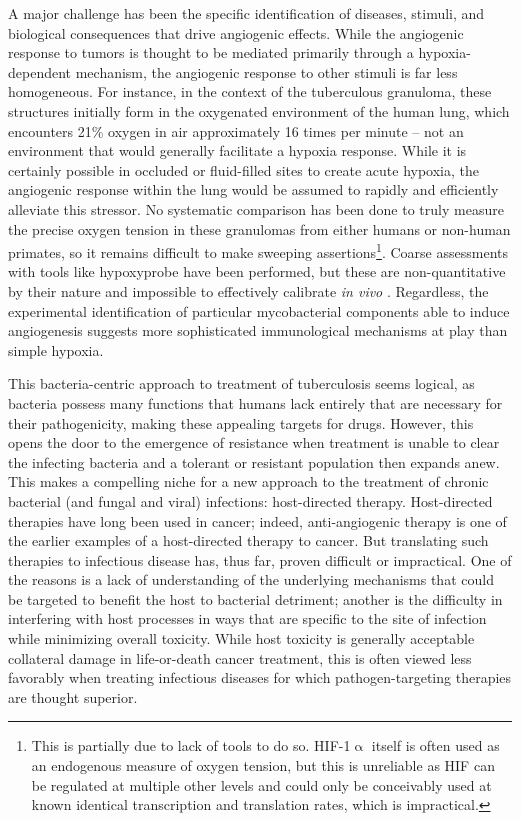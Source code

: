 A major challenge has been the specific identification of diseases, stimuli, and biological consequences that drive angiogenic effects. While the angiogenic response to tumors is thought to be mediated primarily through a hypoxia\hyp{}dependent mechanism, the angiogenic response to other stimuli is far less homogeneous. For instance, in the context of the tuberculous granuloma, these structures initially form in the oxygenated environment of the human lung, which encounters 21\% oxygen in air approximately 16 times per minute -- not an environment that would generally facilitate a hypoxia response. While it is certainly possible in occluded or fluid\hyp{}filled sites to create acute hypoxia, the angiogenic response within the lung would be assumed to rapidly and efficiently alleviate this stressor. No systematic comparison has been done to truly measure the precise oxygen tension in these granulomas from either humans or non\hyp{}human primates, so it remains difficult to make sweeping assertions\footnote{This is partially due to lack of tools to do so. HIF\hyp{}1$\upalpha$ itself is often used as an endogenous measure of oxygen tension, but this is unreliable as HIF can be regulated at multiple other levels and could only be conceivably used at known identical transcription and translation rates, which is impractical.}. Coarse assessments with tools like hypoxyprobe have been performed, but these are non\hyp{}quantitative by their nature and impossible to effectively calibrate \textit{in vivo} \citep{Cousins2016}. Regardless, the experimental identification of particular mycobacterial components able to induce angiogenesis suggests more sophisticated immunological mechanisms at play than simple hypoxia.

This bacteria\hyp{}centric approach to treatment of tuberculosis seems logical, as bacteria possess many functions that humans lack entirely that are necessary for their pathogenicity, making these appealing targets for drugs. However, this opens the door to the emergence of resistance when treatment is unable to clear the infecting bacteria and a tolerant or resistant population then expands anew. This makes a compelling niche for a new approach to the treatment of chronic bacterial (and fungal and viral) infections: host\hyp{}directed therapy. Host\hyp{}directed therapies have long been used in cancer; indeed, anti\hyp{}angiogenic therapy is one of the earlier examples of a host\hyp{}directed therapy to cancer. But translating such therapies to infectious disease has, thus far, proven difficult or impractical. One of the reasons is a lack of understanding of the underlying mechanisms that could be targeted to benefit the host to bacterial detriment; another is the difficulty in interfering with host processes in ways that are specific to the site of infection while minimizing overall toxicity. While host toxicity is generally acceptable collateral damage in life\hyp{}or\hyp{}death cancer treatment, this is often viewed less favorably when treating infectious diseases for which pathogen\hyp{}targeting therapies are thought superior. 

